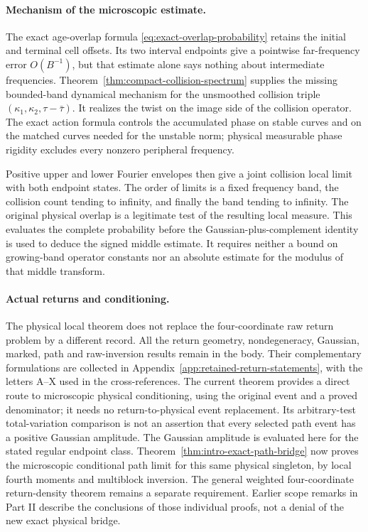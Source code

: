\documentclass[11pt,reqno]{amsart}
\numberwithin{equation}{section}
\theoremstyle{definition}\newtheorem{definition}[theorem]{Definition}
\theoremstyle{remark}\newtheorem{remark}[theorem]{Remark}
\begin{document}
\paragraph{Mechanism of the microscopic estimate.}
The exact age-overlap formula
\eqref{eq:exact-overlap-probability} retains the initial and terminal
cell offsets. Its two interval endpoints give a pointwise far-frequency
error $O(B^{-1})$, but that estimate alone says nothing about intermediate
frequencies. Theorem~\ref{thm:compact-collision-spectrum} supplies the
missing bounded-band dynamical mechanism for the unsmoothed collision
triple $(\kappa_1,\kappa_2,\tau-\bar\tau)$. It realizes the twist on
the image side of the collision operator. The exact action formula
controls the accumulated phase on stable curves and on the matched
curves needed for the unstable norm; physical measurable phase rigidity
excludes every nonzero peripheral frequency.

Positive upper and lower Fourier envelopes then give a joint collision
local limit with both endpoint states. The order of limits is a fixed
frequency band, the collision count tending to infinity, and finally
the band tending to infinity. The original physical overlap is a
legitimate test of the resulting local measure. This evaluates the
complete probability before the Gaussian-plus-complement identity is
used to deduce the signed middle estimate. It requires neither a bound
on growing-band operator constants nor an absolute estimate for the
modulus of that middle transform.

\paragraph{Actual returns and conditioning.}
The physical local theorem does not replace the four-coordinate raw
return problem by a different record. All the return geometry,
nondegeneracy, Gaussian, marked, path and raw-inversion results remain
in the body. Their complementary formulations are collected in
Appendix~\ref{app:retained-return-statements}, with the letters A--X
used in the cross-references. The current theorem provides a direct
route to microscopic physical conditioning, using the original event
and a proved denominator; it needs no return-to-physical event
replacement. Its arbitrary-test total-variation comparison is not an
assertion that every selected path event has a positive Gaussian
amplitude. The Gaussian amplitude is evaluated here for the stated
regular endpoint class. Theorem~\ref{thm:intro-exact-path-bridge} now proves the microscopic
conditional path limit for this same physical singleton, by local
fourth moments and multiblock inversion. The general weighted
four-coordinate return-density theorem remains a separate requirement.
Earlier scope remarks in Part II describe the conclusions of those
individual proofs, not a denial of the new exact physical bridge.
\end{document}
